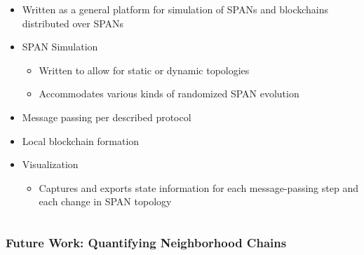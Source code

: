 \documentclass{beamer}
\begin{document}
\begin{frame}
\begin{columns}
		\begin{column}{0.7\textwidth}
			\centering
			\begin{itemize}
				\item Written as a general platform for simulation
					of SPANs and blockchains distributed over
					SPANs
				\item SPAN Simulation
					\begin{itemize}
						\item Written to allow for static or dynamic
							topologies
						\item Accommodates various kinds of randomized
							SPAN evolution
					\end{itemize}
				\item Message passing per described protocol
				\item Local blockchain formation
				\item Visualization
					\begin{itemize}
						\item Captures and exports state information for
							each message-passing step and each change in
							SPAN topology
					\end{itemize}
			\end{itemize}
		\end{column}
	\end{columns}	
\end{frame}

\begin{frame}
	\frametitle{Future Work: Quantifying Neighborhood Chains}

	\begin{columns}
		\begin{column}{0.5\textwidth}
			\centering
		\end{column}

		\begin{column}{0.5\textwidth}
			\centering
		\end{column}
	\end{columns}
\end{frame}
\end{document}
